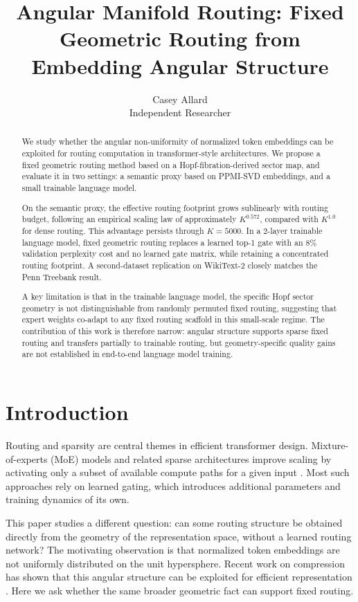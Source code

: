 \documentclass[10pt,twocolumn]{article}
\title{Angular Manifold Routing: Fixed Geometric Routing from Embedding Angular Structure}
\author{Casey Allard\\Independent Researcher}
\date{}
\begin{document}
\maketitle

\begin{abstract}
We study whether the angular non-uniformity of normalized token embeddings can be exploited for routing computation in transformer-style architectures. We propose a fixed geometric routing method based on a Hopf-fibration-derived sector map, and evaluate it in two settings: a semantic proxy based on PPMI-SVD embeddings, and a small trainable language model.

On the semantic proxy, the effective routing footprint grows sublinearly with routing budget, following an empirical scaling law of approximately $K^{0.572}$, compared with $K^{1.0}$ for dense routing. This advantage persists through $K=5000$. In a 2-layer trainable language model, fixed geometric routing replaces a learned top-1 gate with an 8\% validation perplexity cost and no learned gate matrix, while retaining a concentrated routing footprint. A second-dataset replication on WikiText-2 closely matches the Penn Treebank result.

A key limitation is that in the trainable language model, the specific Hopf sector geometry is not distinguishable from randomly permuted fixed routing, suggesting that expert weights co-adapt to any fixed routing scaffold in this small-scale regime. The contribution of this work is therefore narrow: angular structure supports sparse fixed routing and transfers partially to trainable routing, but geometry-specific quality gains are not established in end-to-end language model training.
\end{abstract}

\section{Introduction}
Routing and sparsity are central themes in efficient transformer design. Mixture-of-experts (MoE) models and related sparse architectures improve scaling by activating only a subset of available compute paths for a given input \citep{shazeer2017outrageously,fedus2022switch}. Most such approaches rely on learned gating, which introduces additional parameters and training dynamics of its own.

This paper studies a different question: can some routing structure be obtained directly from the geometry of the representation space, without a learned routing network? The motivating observation is that normalized token embeddings are not uniformly distributed on the unit hypersphere. Recent work on compression has shown that this angular structure can be exploited for efficient representation \citep{turboquant2026}. Here we ask whether the same broader geometric fact can support fixed routing.
\end{document}
